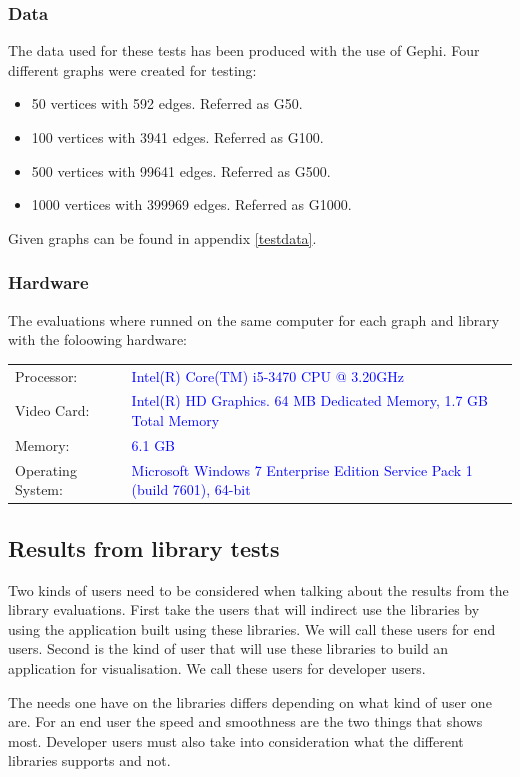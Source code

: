 \documentclass[a4paper,11pt]{kth-mag}
\begin{document}
\begin{appendices}
\subsubsection{Data}
The data used for these tests has been produced with the use of Gephi\cite{website:gephi}. Four different graphs were created for testing:

\begin{itemize}
	\item{50 vertices with 592 edges. Referred as G50.}
	\item{100 vertices with 3941 edges. Referred as G100.}
	\item{500 vertices with 99641 edges. Referred as G500.}
	\item{1000 vertices with 399969 edges. Referred as G1000.}
\end{itemize}
\newline
Given graphs can be found in appendix \ref{testdata}.
\subsubsection{Hardware}
The evaluations where runned on the same computer for each graph and library with the foloowing hardware:\\
\newline
\begin{tabular}{ l l }
	Processor: & \textcolor{blue}{Intel(R) Core(TM) i5-3470 CPU @ 3.20GHz}\\
	Video Card: & \textcolor{blue}{Intel(R) HD Graphics. 64 MB Dedicated Memory, 1.7 GB Total Memory}\\
	Memory: & \textcolor{blue}{6.1 GB}\\
	Operating System: & \textcolor{blue}{Microsoft Windows 7 Enterprise Edition Service Pack 1 (build 7601), 64-bit}\\
\end{tabular}	
\subsection{Results from library tests}
Two kinds of users need to be considered when talking about the results from the library evaluations. First take the users that will indirect use the libraries by using the application 
built using these libraries. We will call these users for end users. Second is the kind of user that will use these libraries to build an application for visualisation. We call these users for developer users.

The needs one have on the libraries differs depending on what kind of user one are. For an end user the speed and smoothness are the two things that shows most. Developer users must also take into consideration
what the different libraries supports and not.\\


\end{appendices}
\end{document}
